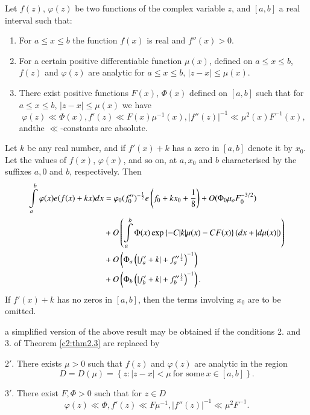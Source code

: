 \begin{thm}\label{c2:thm2.3}
  Let $f(z)$, $\varphi(z)$ be two functions of the complex variable
  $z$, and $[a, b]$ a real interval such that:
  \begin{enumerate}
    \item For $a\leq x \leq b$ the function $f(x)$ is real and
      $f''(x)> 0$.
      \item For a certain positive differentiable function $\mu(x)$,
        defined on $a \leq x \leq b$, $f(z)$ and $\varphi(z)$ are
        analytic for $a \leq x \leq b$, $|z- x|\leq \mu (x)$.
        \item There exist positive functions $F(x)$, $\Phi (x)$
          defined on $[a, b]$ such that for $a \leq x \leq b$, $|z-
          x|\leq \mu (x)$ we have
          $$
          \varphi (z) \ll \Phi (x), f' (z) \ll F(x) \mu^{-1} (x), |f''
          (z)|^{-1} \ll \mu^2 (x) F^{-1} (x),
          $$
      and\pageoriginale the $\ll$-constants are absolute.
  \end{enumerate}
  Let $k$ be any real number, and if $f' (x) + k$ has a zero in $[a,
    b]$ denote it by $x_0$. Let the values of $f(x)$, $\varphi(x)$,
  and so on, at $a, x_0$ and $b$ characterised by the suffixes $a, 0$
  and $b$, respectively. Then
{\fontsize{10}{12}\selectfont
\begin{align}
\int\limits_a^b \varphi (x) e (f (x) + kx) dx &= \varphi_0
(f''_0)^{- \frac{1}{2}} e\left(f_0 + kx_0 +
\frac{1}{8}\right)+ O (\Phi_0 \mu_o F_0^{-3/2})\notag\\
&  + O\left( \int\limits_a^b \Phi (x)
\exp \left\{- C |k|\mu (x)- CF (x) \right\} (dx + |d \mu
(x)|)\right)\notag\\ 
&+ O \left(\Phi_a \left(| f'_a + k| + f''_a{}^{\frac{1}{2}}
\right)^{-1}\right)\notag\\
& + O \left(\Phi_b \left(|f'_b + k|+
f''_b{}^{\frac{1}{2}} \right)^{-1} \right).\label{c2:eq2.52}
\end{align}}
  If $f'(x) +k$ has no zeros in $[a, b]$, then the terms involving
  $x_0$ are to be omitted.
\end{thm}

a simplified version of the above result may be obtained if the
conditions 2. and 3. of Theorem \ref{c2:thm2.3} are replaced by 

$2'$. There exists $\mu> 0$ such that $f(z)$ and $\varphi (z)$ are
analytic in the region
$$
D= D(\mu) = \left\{ z : |z- x|< \mu ~\text{for some}~ x \in [a, b]\right\}.
$$

$3'$. There exist $F, \Phi > 0$ such that for $z \in D$
$$
\varphi (z) \ll \Phi, f' (z) \ll F\mu^{-1}, |f'' (z)|^{-1} \ll \mu^2
F^{-1}. 
$$

